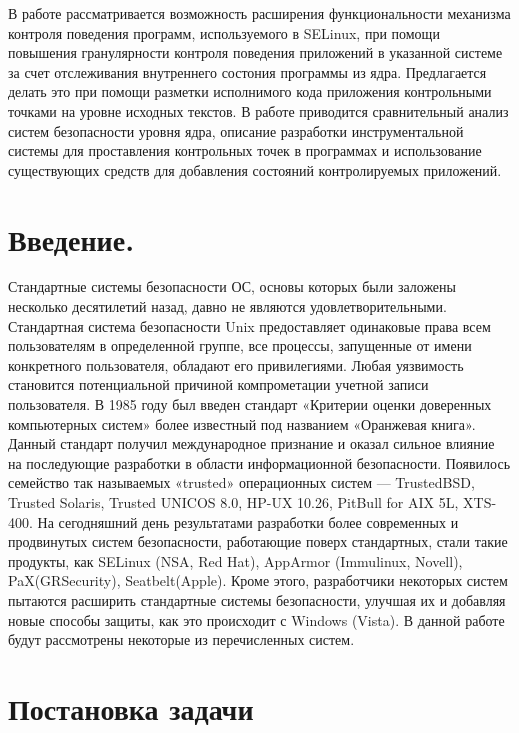 {} 

{\large В работе рассматривается возможность расширения функциональности 
механизма контроля поведения программ, используемого в SELinux, при 
помощи повышения гранулярности контроля поведения приложений
в указанной системе за счет отслеживания внутреннего состония
программы из ядра. Предлагается делать это при помощи
разметки исполнимого кода приложения контрольными точками 
на уровне исходных текстов. В работе приводится сравнительный 
анализ систем безопасности уровня ядра, описание разработки 
инструментальной системы для проставления контрольных точек 
в программах и использование существующих средств для добавления
состояний контролируемых приложений. 
}

\newpage
\tableofcontents
\newpage

\bigskip 
\section{Введение.}

Стандартные системы безопасности ОС, основы которых 
были заложены несколько десятилетий назад, давно не 
являются удовлетворительными. Стандартная система 
безопасности Unix предоставляет одинаковые права всем 
пользователям в определенной группе, все процессы, 
запущенные от имени конкретного пользователя, обладают 
его привилегиями. Любая уязвимость становится 
потенциальной причиной компрометации учетной записи 
пользователя. В 1985 году был введен стандарт «Критерии 
оценки доверенных компьютерных систем» более известный 
под названием «Оранжевая книга». Данный стандарт получил 
международное признание и оказал сильное влияние на 
последующие разработки в области информационной безопасности. 
Появилось семейство так называемых «trusted» операционных 
систем — TrustedBSD, Trusted Solaris, Trusted UNICOS 8.0, 
HP-UX 10.26, PitBull for AIX 5L, XTS-400. На сегодняшний 
день результатами разработки 
более современных и продвинутых систем безопасности, 
работающие поверх стандартных, стали такие продукты, как 
SELinux (NSA, Red Hat), AppArmor (Immulinux, Novell), 
PaX(GRSecurity), Seatbelt(Apple). Кроме этого, разработчики 
некоторых систем пытаются расширить стандартные системы 
безопасности, улучшая их и добавляя новые способы защиты, 
как это происходит с Windows (Vista). В данной работе 
будут рассмотрены некоторые из перечисленных систем.


\section{Постановка задачи}
